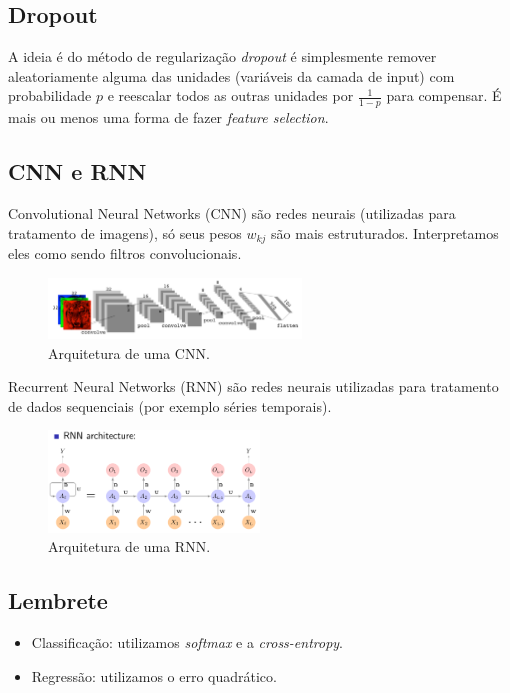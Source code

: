 \documentclass[a4paper,fleqn,12pt]{article}
\begin{document}
\subsection{Dropout}

A ideia é do método de regularização \textit{dropout} é simplesmente remover aleatoriamente alguma das unidades (variáveis da camada de input) com probabilidade $p$ e reescalar todos as outras unidades por $\frac{1}{1-p}$ para compensar. É mais ou menos uma forma de fazer \textit{feature selection}.

\subsection{CNN e RNN}

Convolutional Neural Networks (CNN) são redes neurais (utilizadas para tratamento de imagens), só seus pesos $w_{kj}$ são mais estruturados. Interpretamos eles como sendo filtros convolucionais.
\begin{figure}[H]
\centering
\includegraphics[width=0.6\textwidth]{fig/cnn_architecture.png}
\caption{Arquitetura de uma CNN.}
\label{fig:cnn_architecture}
\end{figure}

Recurrent Neural Networks (RNN) são redes neurais utilizadas para tratamento de dados sequenciais (por exemplo séries temporais).
\begin{figure}[H]
\centering
\includegraphics[width=0.5\textwidth]{fig/rnn_architecture.png}
\caption{Arquitetura de uma RNN.}
\label{fig:rnn_architecture}
\end{figure}

\subsection{Lembrete}

\begin{itemize}
\item Classificação: utilizamos \textit{softmax} e a \textit{cross-entropy}.
\item Regressão: utilizamos o erro quadrático.
\end{itemize}
\end{document}
